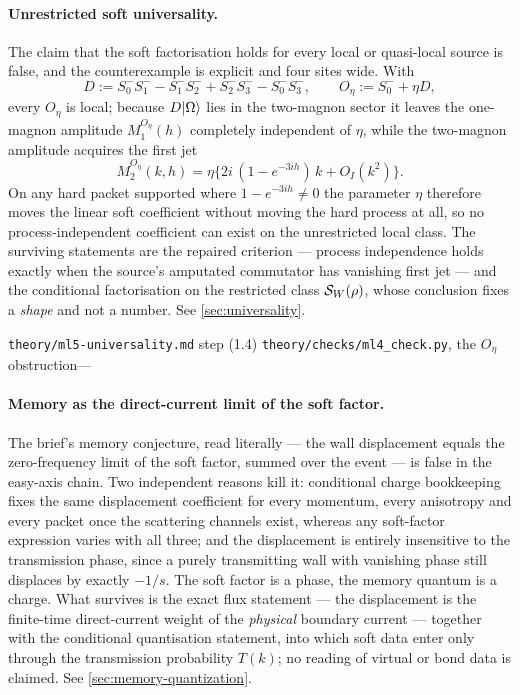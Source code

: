 \paragraph{Unrestricted soft universality.} \statusRefuted{} The claim that
the soft factorisation holds for every local or quasi-local source is false,
and the counterexample is explicit and four sites wide. With
\begin{equation}
  D := S^-_0 S^-_1 - S^-_1 S^-_2 + S^-_2 S^-_3 - S^-_0 S^-_3,
  \qquad
  O_\eta := S^-_0 + \eta D,
\end{equation}
every $O_\eta$ is local; because $D|\Omega\rangle$ lies in the two-magnon sector
it leaves the one-magnon amplitude $M_1^{O_\eta}(h)$ completely independent of
$\eta$, while the two-magnon amplitude acquires the first jet
\begin{equation}
  M_2^{O_\eta}(k,h) = \eta\bigl\{ 2i\,(1-e^{-3ih})\,k + O_I(k^2) \bigr\}.
\end{equation}
On any hard packet supported where $1-e^{-3ih} \neq 0$ the parameter $\eta$
therefore moves the linear soft coefficient without moving the hard process at
all, so no process-independent coefficient can exist on the unrestricted local
class. The surviving statements are the repaired criterion — process
independence holds exactly when the source's amputated commutator has
vanishing first jet — and the conditional factorisation on the restricted
class $\mathcal{S}_W(\rho)$, whose conclusion fixes a \emph{shape} and not a
number. See \cref{sec:universality}.

%
{\texttt{theory/ml5-universality.md} step (1.4)}%
{\texttt{theory/checks/ml4\_check.py}, the $O_\eta$ obstruction}{---}

\paragraph{Memory as the direct-current limit of the soft factor.}
\statusRefuted{} The brief's memory conjecture, read literally — the wall
displacement equals the zero-frequency limit of the soft factor, summed over
the event — is false in the easy-axis chain. Two independent reasons kill it:
conditional charge bookkeeping fixes the same displacement coefficient for
every momentum, every anisotropy and every packet once the scattering channels
exist, whereas any soft-factor expression varies with all three; and the
displacement is entirely insensitive to the transmission phase, since a purely
transmitting wall with vanishing phase still displaces by exactly $-1/s$. The
soft factor is a phase, the memory quantum is a charge. What survives is the
exact flux statement — the displacement is the finite-time direct-current
weight of the \emph{physical} boundary current — together with the conditional
quantisation statement, into which soft data enter only through the
transmission probability $T(k)$; no reading of virtual or bond data is
claimed. See \cref{sec:memory-quantization}.

